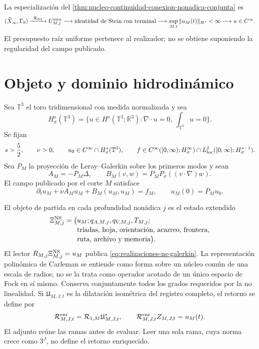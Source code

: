 \noindent La especialización del
\cref{thm:nucleo-continuidad-conexion-nonadica-conjunta} es
\[
 (\widehat X_\infty,\Gamma_9)
 \xrightarrow{\ \mathcal R_{\rm NS}\ }
 U^{\rm own}_{M,j}
 \longrightarrow\text{identidad de Stein con terminal}
 \longrightarrow\sup_{M,t}\|u_M(t)\|_{H^s}<\infty
 \longrightarrow u\in C^\infty.
\]
El presupuesto raíz uniforme pertenece al realizador; no se obtiene
suponiendo la regularidad del campo publicado.

\section*{Objeto y dominio hidrodinámico}

Sea \(\mathbb T^3\) el toro tridimensional con medida normalizada y sea
\[
 H^s_\sigma(\mathbb T^3)
 =\{u\in H^s(\mathbb T^3;\mathbb R^3):
      \nabla\!\cdot u=0,\ \textstyle\int_{\mathbb T^3}u=0\}.
\]
Se fijan
\begin{equation}\label{eq:realizaciones-ns-dominio}
 s>\frac52,
 \qquad \nu>0,
 \qquad u_0\in C^\infty\cap H^s_\sigma(\mathbb T^3),
 \qquad
 f\in C^\infty([0,\infty);H^\infty_\sigma)
       \cap L^2_{\rm loc}([0,\infty);H^{s-1}_\sigma).
\end{equation}
Sea \(P_M\) la proyección de Leray--Galerkin sobre los primeros modos y sean
\[
 A_M=-P_M\Delta,
 \qquad
 B_M(v,w)=P_MP_\sigma((v\!\cdot\!\nabla)w).
\]
El campo publicado por el corte \(M\) satisface
\begin{equation}\label{eq:realizaciones-ns-galerkin}
 \partial_tu_M+\nu A_Mu_M+B_M(u_M,u_M)=f_M,
 \qquad u_M(0)=P_Mu_0.
\end{equation}

El objeto de partida en cada profundidad nonádica \(j\) es el estado
extendido
\begin{equation}\label{eq:realizaciones-ns-estado}
 \begin{aligned}
 \Xi_{M,j}^{\rm NS}
 =\bigl(&u_M;q_{A,M,j},q_{V,M,j},T_{M,j};\\[-1mm]
        &\text{tríadas, hoja, orientación, acarreo, frontera,}\\[-1mm]
        &\text{ruta, archivo y memoria}\bigr).
 \end{aligned}
\end{equation}
El lector \(R_{M,j}\Xi_{M,j}^{\rm NS}=u_M\) publica
\eqref{eq:realizaciones-ns-galerkin}. La representación polinómica de
Carleman se entiende como forma sobre un núcleo común de una escala de radios;
no se la trata como operador acotado de un único espacio de Fock en sí mismo.
Conserva conjuntamente todos los grados requeridos por la no linealidad. Si
\(\mathfrak U_{M,J,t}\) es la dilatación isométrica del registro completo,
el retorno se define por
\begin{equation}\label{eq:realizaciones-ns-retorno-completo}
 \mathcal R_{M,J,t}^{\rm enr}
 =\mathcal R_{1,M}\mathfrak U_{M,J,t}^*,
 \qquad
 \mathcal R_{M,J,t}^{\rm enr}Z_{M,J,t}=u_M(t).
\end{equation}
El adjunto reúne las ramas antes de evaluar. Leer una sola rama, cuya norma
crece como \(3^J\), no define el retorno enriquecido.

